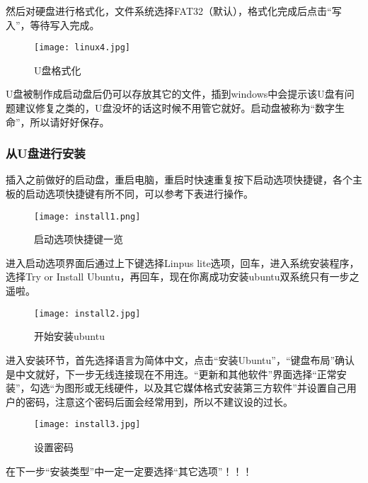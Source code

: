 然后对硬盘进行格式化，文件系统选择FAT32（默认），格式化完成后点击“写入”，等待写入完成。

\begin{figure}[H]
    \centering
    \texttt{[image: linux4.jpg]}
    \caption{U盘格式化} %
    \label{fig:linux4} %
\end{figure}

U盘被制作成启动盘后仍可以存放其它的文件，插到windows中会提示该U盘有问题建议修复之类的，U盘没坏的话这时候不用管它就好。启动盘被称为“数字生命”，所以请好好保存。
\subsubsection{从U盘进行安装}
插入之前做好的启动盘，重启电脑，重启时快速重复按下启动选项快捷键，各个主板的启动选项快捷键有所不同，可以参考下表进行操作。

\begin{figure}[H]
    \centering
    \texttt{[image: install1.png]}
    \caption{启动选项快捷键一览} %
    \label{fig:install1} %
\end{figure}

进入启动选项界面后通过上下键选择Linpus lite选项，回车，进入系统安装程序，选择Try or Install Ubuntu，再回车，现在你离成功安装ubuntu双系统只有一步之遥啦。

\begin{figure}[H]
    \centering
    \texttt{[image: install2.jpg]}
    \caption{开始安装ubuntu} %
    \label{fig:install2} %
\end{figure}

进入安装环节，首先选择语言为简体中文，点击“安装Ubuntu”，“键盘布局”确认是中文就好，下一步无线连接现在不用连。“更新和其他软件”界面选择“正常安装”，勾选“为图形或无线硬件，以及其它媒体格式安装第三方软件”并设置自己用户的密码，注意这个密码后面会经常用到，所以不建议设的过长。

\begin{figure}[H]
    \centering
    \texttt{[image: install3.jpg]}
    \caption{设置密码} %
    \label{fig:install3} %
\end{figure}

在下一步“安装类型”中一定一定要选择“其它选项”！！！

